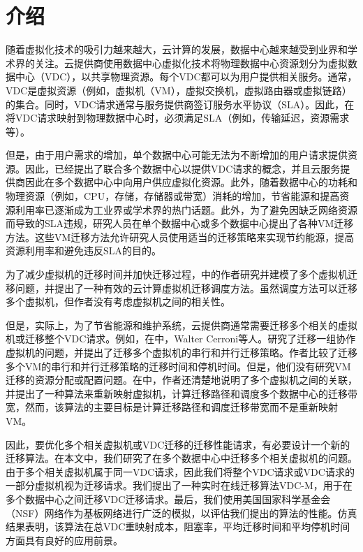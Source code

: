 \chapter{介绍}
随着虚拟化技术的吸引力越来越大，云计算的发展，数据中心越来越受到业界和学术界的关注。云提供商使用数据中心虚拟化技术将物理数据中心资源划分为虚拟数据中心（VDC），以共享物理资源。每个VDC都可以为用户提供相关服务。通常，VDC是虚拟资源（例如，虚拟机（VM），虚拟交换机，虚拟路由器或虚拟链路）的集合。同时，VDC请求通常与服务提供商签订服务水平协议（SLA）。因此，在将VDC请求映射到物理数据中心时，必须满足SLA（例如，传输延迟，资源需求等）。

但是，由于用户需求的增加，单个数据中心可能无法为不断增加的用户请求提供资源。因此，已经提出了联合多个数据中心以提供VDC请求的概念，并且云服务提供商因此在多个数据中心中向用户供应虚拟化资源\cite{jin2012efficient, amokrane2013greenhead, xu2015rethink}。此外，随着数据中心的功耗和物理资源（例如，CPU，存储，存储器或带宽）消耗的增加，节省能源和提高资源利用率已逐渐成为工业界或学术界的热门话题。此外，为了避免因缺乏网络资源而导致的SLA违规，研究人员在单个数据中心或多个数据中心提出了各种VM迁移方法\cite{adami2013virtual, aiash2014secure, zhang2013scheduling, cerroni2014multiple, callegati2013live, sarker2013performance}。这些VM迁移方法允许研究人员使用适当的迁移策略来实现节约能源，提高资源利用率和避免违反SLA的目的。

为了减少虚拟机的迁移时间并加快迁移过程，\cite{zhang2013scheduling}中的作者研究并建模了多个虚拟机迁移问题，并提出了一种有效的云计算虚拟机迁移调度方法。虽然调度方法可以迁移多个虚拟机，但作者没有考虑虚拟机之间的相关性。

但是，实际上，为了节省能源和维护系统，云提供商通常需要迁移多个相关的虚拟机或迁移整个VDC请求。例如，在\cite{cerroni2014multiple, callegati2013live}中，Walter Cerroni等人。研究了迁移一组协作虚拟机的问题，并提出了迁移多个虚拟机的串行和并行迁移策略。作者比较了迁移多个VM的串行和并行迁移策略的迁移时间和停机时间。但是，他们没有研究VM迁移的资源分配或配置问题。在\cite{sarker2013performance}中，作者还清楚地说明了多个虚拟机之间的关联，并提出了一种算法来重新映射虚拟机，计算迁移路径和调度多个数据中心的迁移带宽，然而，该算法的主要目标是计算迁移路径和调度迁移带宽而不是重新映射VM。

因此，要优化多个相关虚拟机或VDC迁移的迁移性能请求，有必要设计一个新的迁移算法。在本文中，我们研究了在多个数据中心中迁移多个相关虚拟机的问题。由于多个相关虚拟机属于同一VDC请求，因此我们将整个VDC请求或VDC请求的一部分虚拟机视为迁移请求。我们提出了一种实时在线迁移算法VDC-M，用于在多个数据中心之间迁移VDC迁移请求。最后，我们使用美国国家科学基金会（NSF）网络作为基板网络进行广泛的模拟，以评估我们提出的算法的性能。仿真结果表明，该算法在总VDC重映射成本，阻塞率，平均迁移时间和平均停机时间方面具有良好的应用前景。

